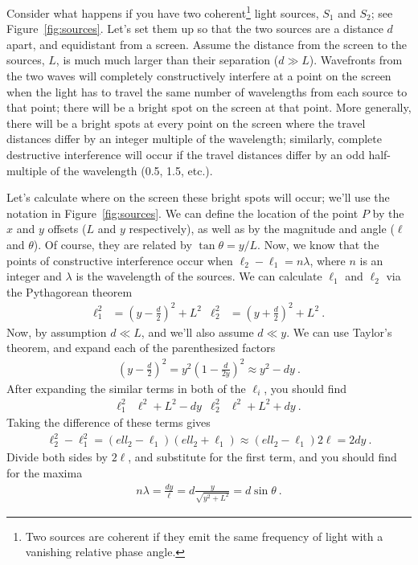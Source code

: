 \documentclass[12pt]{article}
\newcommand{\Sone}{\ensuremath{S_1}\xspace}
\newcommand{\Stwo}{\ensuremath{S_2}\xspace}
\begin{document}
Consider what happens if you have two coherent\footnote{Two sources
  are coherent if they emit the same frequency of light with a
  vanishing relative phase angle.} light sources, \Sone and \Stwo; see
Figure~\ref{fig:sources}.  Let's set them up so that the two sources
are a distance $d$ apart, and equidistant from a screen.  Assume the
distance from the screen to the sources, $L$, is much much larger than
their separation ($d\gg L$).  Wavefronts from the two waves will
completely constructively interfere at a point on the screen when the
light has to travel the same number of wavelengths from each source to
that point; there will be a bright spot on the screen at that point.
More generally, there will be a bright spots at every point on the
screen where the travel distances differ by an integer multiple of the
wavelength; similarly, complete destructive interference will occur if
the travel distances differ by an odd half-multiple of the wavelength
(0.5, 1.5, etc.).

Let's calculate where on the screen these bright spots will occur;
we'll use the notation in Figure~\ref{fig:sources}.  We can define the
location of the point $P$ by the $x$ and $y$ offsets ($L$ and $y$
respectively), as well as by the magnitude and angle ($\ell$ and
$\theta$).  Of course, they are related by $\tan\theta = y/L$.  Now,
we know that the points of constructive interference occur when
$\ell_2 - \ell_1 = n \lambda$, where $n$ is an integer and $\lambda$
is the wavelength of the sources.  We can calculate $\ell_1$ and
$\ell_2$ via the Pythagorean theorem
\begin{align*}
  \ell_1^2 &= \left(y - \frac{d}{2}\right)^2 + L^2 & 
  \ell_2^2 &= \left(y + \frac{d}{2}\right)^2 + L^2\ .
\end{align*}
Now, by assumption $d \ll L$, and we'll also assume $d \ll y$.  We can
use Taylor's theorem, and expand each of the parenthesized factors
\begin{gather*}
  \left(y - \frac{d}{2}\right)^2 =   y^2 \left(1 -
    \frac{d}{2y}\right)^2 \approx 
  y^2 - dy\ .
\end{gather*}
After expanding the similar terms in both of the $\ell_i$, you should
find
\begin{align*}
  \ell_1^2 & \ell^2 + L^2 - dy &
  \ell_2^2 & \ell^2 + L^2 + dy \ .
\end{align*}
Taking the difference of these terms gives
\begin{gather*}
  \ell_2^2 - \ell_1^2 = \left( ell_2 - \ell_1 \right) \left( ell_2 +
    \ell_1 \right) \approx \left( ell_2 - \ell_1 \right) 2 \ell = 2dy\ .
\end{gather*}
Divide both sides by $2\ell$, and substitute for the first term, and
you should find for the maxima
\begin{gather}
  n \lambda = \frac{dy}{\ell} = d \frac{y}{\sqrt{y^2 + L^2}} = d
  \sin\theta\ .
\label{eq:grating}
\end{gather}
\end{document}
